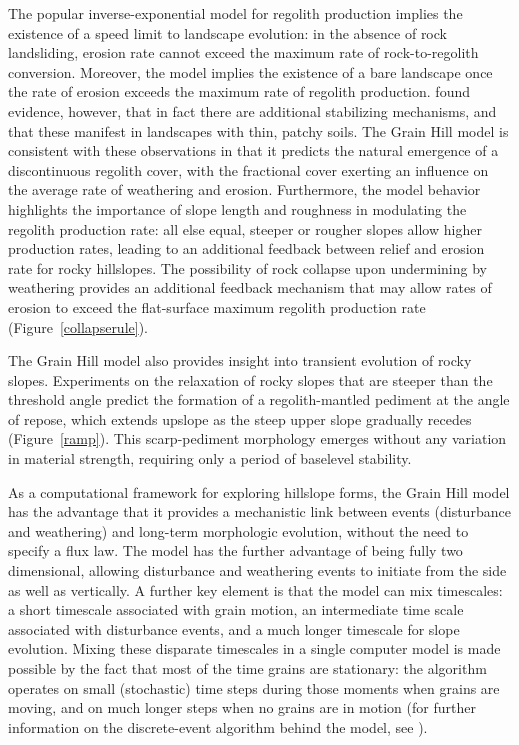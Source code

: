 \documentclass[esurf, manuscript]{copernicus}
\begin{document}
The popular inverse-exponential model for regolith production implies the existence of a speed limit to landscape evolution: in the absence of rock landsliding, erosion rate cannot exceed the maximum rate of rock-to-regolith conversion. Moreover, the model implies the existence of a bare landscape once the rate of erosion exceeds the maximum rate of regolith production. \citet{heimsath2012soil} found evidence, however, that in fact there are additional stabilizing mechanisms, and that these manifest in landscapes with thin, patchy soils. The 
Grain Hill model is consistent with these observations in that it predicts the natural emergence of a discontinuous regolith cover, with the fractional cover exerting an influence on the average rate of weathering and erosion. Furthermore, the model behavior highlights the importance of slope length and roughness in modulating the regolith production rate: all else equal, steeper or rougher slopes allow higher production rates, leading to an additional feedback between relief and erosion rate for rocky hillslopes. The possibility of rock collapse upon undermining by weathering provides an additional feedback mechanism that may allow rates of erosion to exceed the flat-surface maximum regolith production rate (Figure~\ref{collapserule}).

The Grain Hill model also provides insight into transient evolution of rocky slopes. Experiments on the relaxation of rocky slopes that are steeper than the threshold angle predict the formation of a regolith-mantled pediment at the angle of repose, which extends upslope as the steep upper slope gradually recedes (Figure~\ref{ramp}). This scarp-pediment morphology emerges without any variation in material strength, requiring only a period of baselevel stability.

As a computational framework for exploring hillslope forms, the Grain Hill model has the advantage that it provides a mechanistic link between events (disturbance and weathering) and long-term morphologic evolution, without the need to specify a flux law. The model has the further advantage of being fully two dimensional, allowing disturbance and weathering events to initiate from the side as well as vertically. A further key element is that the model can mix timescales: a short timescale associated with grain motion, an intermediate time scale associated with disturbance events, and a much longer timescale for slope evolution. Mixing these disparate timescales in a single computer model is made possible by the fact that most of the time grains are stationary: the algorithm operates on small (stochastic) time steps during those moments when grains are moving, and on much longer steps when no grains are in motion (for further information on the discrete-event algorithm behind the model, see \citet{tucker2016celllab}).
\end{document}
